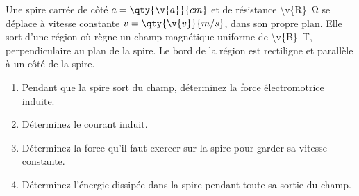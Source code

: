 Une spire carrée de côté $a = \qty{\v{a}}{cm}$ et de résistance \qty{\v{R}}{\ohm} se déplace à vitesse constante $v = \qty{\v{v}}{m/s}$, dans son propre plan. Elle sort d'une région où règne un champ magnétique uniforme de \qty{\v{B}}{T}, perpendiculaire au plan de la spire. Le bord de la région est rectiligne et parallèle à un côté de la spire.

\begin{center}
\end{center}

\begin{enumerate}[label=\alph*)]
    \item Pendant que la spire sort du champ, déterminez la force électromotrice induite.
    \item Déterminez le courant induit.
    \item Déterminez la force qu'il faut exercer sur la spire pour garder sa vitesse constante.
    \item Déterminez l'énergie dissipée dans la spire pendant toute sa sortie du champ.
\end{enumerate}
